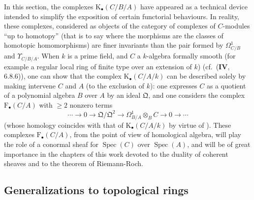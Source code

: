 \begin{remark}[20.6.26]
\label{0.20.6.26}
In this section, the complexes $\mathrm{K}_\bullet(C/B/A)$ have appeared as a technical device intended to simplify the exposition of certain functorial behaviours.
In reality, these complexes, considered as objects of the category of complexes of $C$-modules ``up to homotopy'' (that is to say where the morphisms are the classes of homotopic homomorphisms) are finer invariants than the pair formed by $\Omega^1_{C/B}$ and $\Upsilon_{C/B/A}$.
When $k$ is a prime field, and $C$ a $k$-algebra formally smooth (for example a regular local ring of finite type over an extension of $k$) (cf.\ ($\mathbf{IV}$, 6.8.6)), one can show that the complex $\mathrm{K}_\bullet(C/A/k)$ can be described solely by making intervene $C$ and $A$ (to the exclusion of $k$): one expresses $C$ as a quotient of a polynomial algebra $B$ over $A$ by an ideal $\mathfrak{Q}$, and one considers the complex $\mathrm{F}_\bullet(C/A)$ with $\geq 2$ nonzero terms
\[
  \cdots\to 0\to\mathfrak{Q}/\mathfrak{Q}^2\to\Omega^1_{B/A}\otimes_B C\to 0\to\cdots
\]
(whose homology coincides with that of $\mathrm{K}_\bullet(C/A/k)$ by virtue of ).
These complexes $\mathrm{F}_\bullet(C/A)$, from the point of view of homological algebra, will play the role of a conormal sheaf for $\operatorname{Spec}(C)$ over $\operatorname{Spec}(A)$, and will be of great importance in the chapters of this work devoted to the duality of coherent sheaves and to the theorem of Riemann-Roch.
\end{remark}

\subsection{Generalizations to topological rings}
\label{subsection:0.20.7}


